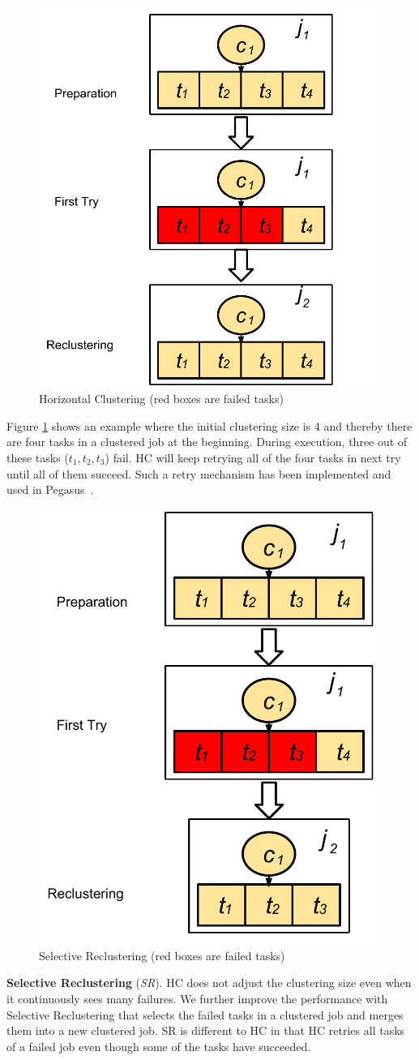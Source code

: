 \begin{figure}[!htb]
\centering
  \includegraphics[width=0.45\linewidth]{figures/tolerance/hcr.pdf}
  \caption{Horizontal Clustering (red boxes are failed tasks)}
  \label{fig:clustering_hc}
\end{figure}

Figure \ref{fig:clustering_hc} shows an example where the initial clustering size is 4 and thereby there are four tasks in a clustered job at the beginning. During execution, three out of these tasks ($t_1, t_2, t_3$) fail. HC will keep retrying all of the four tasks in next try until all of them succeed. Such a retry mechanism has been implemented and used in Pegasus~\cite{Singh2008}.




\begin{figure}[!htb]
\centering
  \includegraphics[width=0.40\linewidth]{figures/tolerance/sr.pdf}
  \caption{Selective Reclustering (red boxes are failed tasks)}
  \label{fig:clustering_sr}
\end{figure}

\textbf{Selective Reclustering} (\emph{SR}). HC does not adjust the clustering size even when it continuously sees many failures. We further improve the performance with Selective Reclustering that selects the failed tasks in a clustered job and merges them into a new clustered job. SR is different to HC in that HC retries all tasks of a failed job even though some of the tasks have succeeded. 

